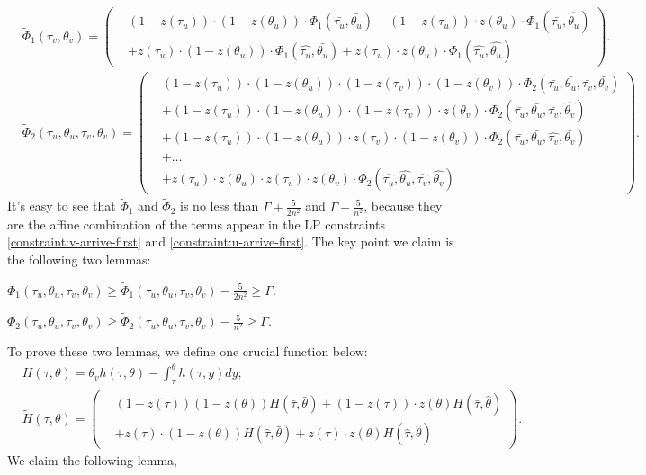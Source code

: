 \begin{align*}
&\tilde{\Phi}_1(\tau_v,\theta_v)= \left(
\begin{aligned}
    & (1-z(\tau_u))\cdot(1-z(\theta_u)) \cdot \Phi_1(\bar{\tau_u},\bar{\theta_u}) 
    + (1-z(\tau_u))\cdot z(\theta_u) \cdot \Phi_1(\bar{\tau_u},\hat{\theta_u}) \\
    &+ z(\tau_u) \cdot (1-z(\theta_u)) \cdot \Phi_1(\hat{\tau_u},\bar{\theta_u}) 
    + z(\tau_u) \cdot z(\theta_u) \cdot \Phi_1(\hat{\tau_u},\hat{\theta_u})
\end{aligned}\right).
\\
&\tilde{\Phi}_2(\tau_u,\theta_u,\tau_v,\theta_v)= \left(
\begin{aligned}
    & (1-z(\tau_u))\cdot(1-z(\theta_u))\cdot(1-z(\tau_v))\cdot(1-z(\theta_v)) \cdot \Phi_2(\bar{\tau_u},\bar{\theta_u},\bar{\tau_v},\bar{\theta_v}) \\
    &+ (1-z(\tau_u))\cdot(1-z(\theta_u))\cdot(1-z(\tau_v))\cdot z(\theta_v) \cdot \Phi_2(\bar{\tau_u},\bar{\theta_u},\bar{\tau_v},\hat{\theta_v}) \\
    &+ (1-z(\tau_u))\cdot(1-z(\theta_u))\cdot z(\tau_v) \cdot (1-z(\theta_v)) \cdot \Phi_2(\bar{\tau_u},\bar{\theta_u},\hat{\tau_v},\bar{\theta_v}) \\
    &+ \dots \\
    &+ z(\tau_u) \cdot z(\theta_u) \cdot z(\tau_v) \cdot z(\theta_v) \cdot \Phi_2(\hat{\tau_u},\hat{\theta_u},\hat{\tau_v},\hat{\theta_v})
\end{aligned}
\right).
\end{align*}
It's easy to see that $\tilde{\Phi}_1$ and $\tilde{\Phi}_2$ is no less than $\Gamma + \frac{5}{2n^2}$ and $\Gamma + \frac{5}{n^2}$, because they are the affine combination of the terms appear in the LP constraints \eqref{constraint:v-arrive-first} and \eqref{constraint:u-arrive-first}. The key point we claim is the following two lemmas:
\begin{lemma}
\label{lem:phi1-bound}
    $\Phi_1(\tau_u,\theta_u,\tau_v,\theta_v) \geq \tilde{\Phi}_1(\tau_u,\theta_u,\tau_v,\theta_v) - \frac{5}{2n^2} \geq \Gamma$.
\end{lemma}
\begin{lemma}
\label{lem:phi2-bound}
    $\Phi_2(\tau_u,\theta_u,\tau_v,\theta_v) \geq \tilde{\Phi}_2(\tau_u,\theta_u,\tau_v,\theta_v) - \frac{5}{n^2} \geq \Gamma$.
\end{lemma}
To prove these two lemmas, we define one crucial function below: 
\begin{align*}
&H(\tau,\theta) = \theta_v h(\tau,\theta) - \int_{\tau}^{\theta} h(\tau,y) dy; \\
&\tilde{H}(\tau,\theta) = \left(
\begin{aligned}
    &(1-z(\tau))(1-z(\theta))H(\bar{\tau},\bar{\theta}) 
    + (1-z(\tau))\cdot z(\theta) H(\bar{\tau},\hat{\theta}) \\
    &+ z(\tau)\cdot(1-z(\theta))H(\hat{\tau},\bar{\theta}) 
    + z(\tau)\cdot z(\theta) H(\hat{\tau},\hat{\theta})
\end{aligned}
\right).
\end{align*}
We claim the following lemma, 

